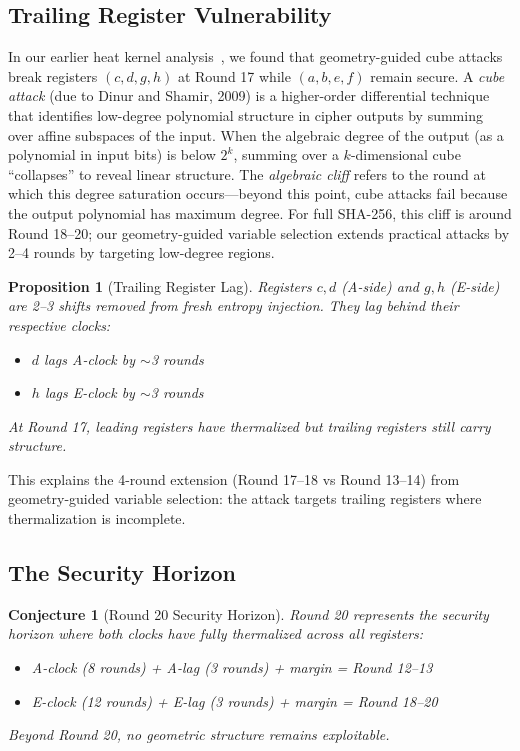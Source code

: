 \documentclass[11pt,a4paper]{article}
\theoremstyle{plain}
\newtheorem{proposition}[theorem]{Proposition}
\newtheorem{conjecture}[theorem]{Conjecture}
\theoremstyle{definition}
\theoremstyle{remark}
\begin{document}
\subsection{Trailing Register Vulnerability}

In our earlier heat kernel analysis~\cite{davis2025heatkernel}, we found that geometry-guided cube attacks break registers $(c, d, g, h)$ at Round 17 while $(a, b, e, f)$ remain secure. A \emph{cube attack} (due to Dinur and Shamir, 2009) is a higher-order differential technique that identifies low-degree polynomial structure in cipher outputs by summing over affine subspaces of the input. When the algebraic degree of the output (as a polynomial in input bits) is below $2^k$, summing over a $k$-dimensional cube ``collapses'' to reveal linear structure. The \emph{algebraic cliff} refers to the round at which this degree saturation occurs---beyond this point, cube attacks fail because the output polynomial has maximum degree. For full SHA-256, this cliff is around Round 18--20; our geometry-guided variable selection extends practical attacks by 2--4 rounds by targeting low-degree regions.

\begin{proposition}[Trailing Register Lag]
Registers $c, d$ (A-side) and $g, h$ (E-side) are 2--3 shifts removed from fresh entropy injection. They lag behind their respective clocks:
\begin{itemize}
    \item $d$ lags A-clock by $\sim$3 rounds
    \item $h$ lags E-clock by $\sim$3 rounds
\end{itemize}
At Round 17, leading registers have thermalized but trailing registers still carry structure.
\end{proposition}

This explains the 4-round extension (Round 17--18 vs Round 13--14) from geometry-guided variable selection: the attack targets trailing registers where thermalization is incomplete.

\subsection{The Security Horizon}

\begin{conjecture}[Round 20 Security Horizon]
Round 20 represents the \emph{security horizon} where both clocks have fully thermalized across all registers:
\begin{itemize}
    \item A-clock (8 rounds) + A-lag (3 rounds) + margin = Round 12--13
    \item E-clock (12 rounds) + E-lag (3 rounds) + margin = Round 18--20
\end{itemize}
Beyond Round 20, no geometric structure remains exploitable.
\end{conjecture}
\end{document}
